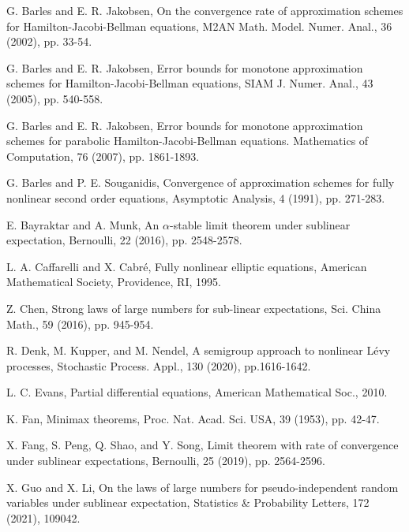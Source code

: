 \documentclass[a4paper,oneside,10pt]{article}%
\numberwithin{equation}{section}
\begin{document}
\begin{thebibliography}{99}                                                                                               %


G. Barles and E. R. Jakobsen, On the convergence rate of
approximation schemes for Hamilton-Jacobi-Bellman equations, M2AN Math. Model.
Numer. Anal., 36 (2002), pp. 33-54.

G. Barles and E. R. Jakobsen, Error bounds for monotone
approximation schemes for Hamilton-Jacobi-Bellman equations, SIAM J. Numer.
Anal., 43 (2005), pp. 540-558.

G. Barles and E. R. Jakobsen, Error bounds for monotone
approximation schemes for parabolic Hamilton-Jacobi-Bellman equations.
Mathematics of Computation, 76 (2007), pp. 1861-1893.

G. Barles and P. E. Souganidis, Convergence of approximation
schemes for fully nonlinear second order equations, Asymptotic Analysis, 4
(1991), pp. 271-283.

E. Bayraktar and A. Munk, An $\alpha$-stable limit theorem
under sublinear expectation, Bernoulli, 22 (2016), pp. 2548-2578.

L. A. Caffarelli and X. Cabr\'{e}, Fully nonlinear elliptic
equations, American Mathematical Society, Providence, RI, 1995.



Z. Chen, Strong laws of large numbers for sub-linear
expectations, Sci. China Math., 59 (2016), pp. 945-954.

R. Denk, M. Kupper, and M. Nendel, A semigroup approach to
nonlinear L\'{e}vy processes, Stochastic Process. Appl., 130 (2020), pp.1616-1642.

L. C. Evans, Partial differential equations, American
Mathematical Soc., 2010.

K. Fan, Minimax theorems, Proc. Nat. Acad. Sci. USA, 39
(1953), pp. 42-47.

X. Fang, S. Peng, Q. Shao, and Y. Song, Limit theorem with
rate of convergence under sublinear expectations, Bernoulli, 25 (2019), pp. 2564-2596.

X. Guo and X. Li, On the laws of large numbers for
pseudo-independent random variables under sublinear expectation, Statistics \&
Probability Letters, 172 (2021), 109042.


\end{thebibliography}
\end{document}
